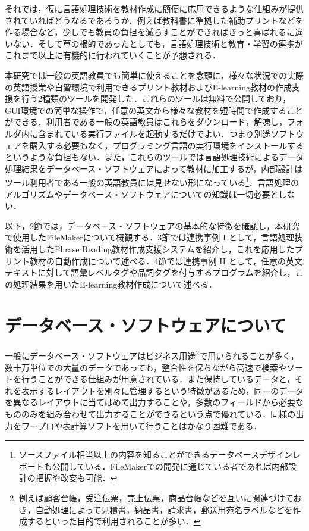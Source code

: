 \documentclass[japanese]{jnlp_1.4}
\begin{document}
それでは，仮に言語処理技術を教材作成に簡便に応用できるような仕組みが提供されていればどうなるであろうか．例えば教科書に準拠した補助プリントなどを作る場合など，少しでも教員の負担を減らすことができればきっと喜ばれるに違いない．そして草の根的であったとしても，言語処理技術と教育・学習の連携がこれまで以上に有機的に行われていくことが予想される．

本研究では一般の英語教員でも簡単に使えることを念頭に，様々な状況での実際の英語授業や自習環境で利用できるプリント教材およびE-learning教材の作成支援を行う2種類のツールを開発した．これらのツールは無料で公開しており，GUI環境での簡単な操作で，任意の英文から様々な教材を短時間で作成することができる．利用者である一般の英語教員はこれらをダウンロード，解凍し，フォルダ内に含まれている実行ファイルを起動するだけでよい．つまり別途ソフトウェアを購入する必要もなく，プログラミング言語の実行環境をインストールするというような負担もない．また，これらのツールでは言語処理技術によるデータ処理結果をデータベース・ソフトウェアによって教材に加工するが，内部設計はツール利用者である一般の英語教員には見せない形になっている\footnote{ソースファイル相当以上の内容を知ることができるデータベースデザインレポートも公開している．FileMakerでの開発に通じている者であれば内部設計の把握や改変も可能．}．言語処理のアルゴリズムやデータベース・ソフトウェアについての知識は一切必要としない．

以下，2節では，データベース・ソフトウェアの基本的な特徴を確認し，本研究で使用したFileMakerについて概観する．3節では連携事例 I として，言語処理技術を活用したPhrase Reading教材作成支援システムを紹介し，これを応用したプリント教材の自動作成について述べる．4節では連携事例 II として，任意の英文テキストに対して語彙レベルタグや品詞タグを付与するプログラムを紹介し，この処理結果を用いたE-learning教材作成について述べる．


\section{データベース・ソフトウェアについて}

一般にデータベース・ソフトウェアはビジネス用途\footnote{例えば顧客台帳，受注伝票，売上伝票，商品台帳などを互いに関連づけておき，自動処理によって見積書，納品書，請求書，郵送用宛名ラベルなどを作成するといった目的で利用されることが多い．}で用いられることが多く，数十万単位での大量のデータであっても，整合性を保ちながら高速で検索やソートを行うことができる仕組みが用意されている．また保持しているデータと，それを表示するレイアウトを別々に管理するという特徴があるため，同一のデータを異なるレイアウトに当てはめて出力することや，多数のフィールドから必要なもののみを組み合わせて出力することができるという点で優れている．同様の出力をワープロや表計算ソフトを用いて行うことはかなり困難である．
\end{document}

